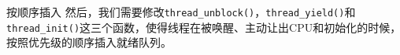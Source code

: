 \documentclass{beamer}
\begin{document}
\begin{frame}

  \framebreak

  \begin{block}{按顺序插入}
    然后，我们需要修改\texttt{thread\_unblock()}，\texttt{thread\_yield()}和\texttt{thread\_init()}这三个函数，使得线程在被唤醒、主动让出CPU和初始化的时候，按照优先级的顺序插入就绪队列。
  \end{block}




        





      


\end{frame}
\end{document}
